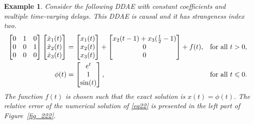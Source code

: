 \documentclass[final,reqno]{siamltex}
\newtheorem{example}[theorem]{Example}
\begin{document}
\begin{example}{\rm
Consider the following DDAE with constant coefficients and multiple time-varying delays. This DDAE is causal and it has
strangeness index two.
%
\begin{equation}\label{eq22}
\begin{aligned}
\m{
0&1&0\\
0&0&1 \\
0&0&0
}
\m{\dot{x}_1(t) \\ \dot{x}_2(t) \\ \dot{x}_3(t)} &=
\m{x_1(t) \\ x_2(t) \\ x_3(t)} +
\m{
x_2(t-1)+x_3(\tfrac t2-1)\\
0\\
0
}
+f(t), && \mbox{for all } t>0,\\
\phi(t) &=
\m{
e^t\\
1\\
\sin(t)
},
&& \mbox{for all } t \leq 0.
\end{aligned}
\end{equation}
%
The function $f(t)$ is chosen such that the exact solution is $x(t)=\phi(t)$. The relative error of the numerical solution of \eqref{eq22} is presented in the left part of Figure~\ref{fig_222}.
}
\end{example}
\end{document}
